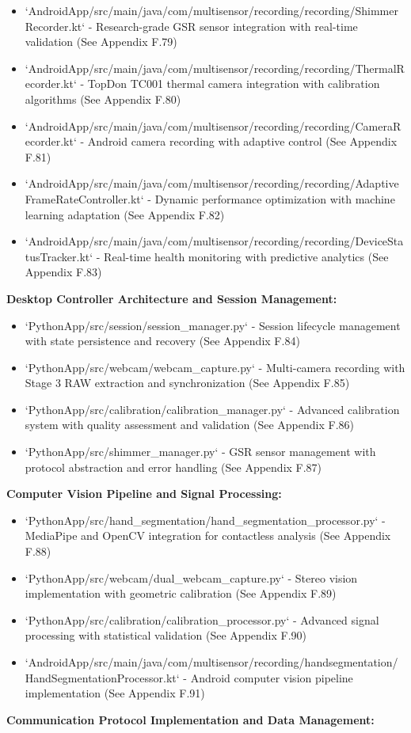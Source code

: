 \documentclass[12pt,a4paper]{article}
\begin{document}
\begin{itemize}
\item `AndroidApp/src/main/java/com/multisensor/recording/recording/ShimmerRecorder.kt` - Research-grade GSR sensor
  integration with real-time validation (See Appendix F.79)
\item `AndroidApp/src/main/java/com/multisensor/recording/recording/ThermalRecorder.kt` - TopDon TC001 thermal camera
  integration with calibration algorithms (See Appendix F.80)
\item `AndroidApp/src/main/java/com/multisensor/recording/recording/CameraRecorder.kt` - Android camera recording with
  adaptive control (See Appendix F.81)
\item `AndroidApp/src/main/java/com/multisensor/recording/recording/AdaptiveFrameRateController.kt` - Dynamic performance
  optimization with machine learning adaptation (See Appendix F.82)
\item `AndroidApp/src/main/java/com/multisensor/recording/recording/DeviceStatusTracker.kt` - Real-time health monitoring
  with predictive analytics (See Appendix F.83)

\end{itemize}
\textbf{Desktop Controller Architecture and Session Management:}

\begin{itemize}
\item `PythonApp/src/session/session_manager.py` - Session lifecycle management with state persistence and recovery (See
  Appendix F.84)
\item `PythonApp/src/webcam/webcam_capture.py` - Multi-camera recording with Stage 3 RAW extraction and synchronization (See
  Appendix F.85)
\item `PythonApp/src/calibration/calibration_manager.py` - Advanced calibration system with quality assessment and
  validation (See Appendix F.86)
\item `PythonApp/src/shimmer_manager.py` - GSR sensor management with protocol abstraction and error handling (See Appendix
  F.87)

\end{itemize}
\textbf{Computer Vision Pipeline and Signal Processing:}

\begin{itemize}
\item `PythonApp/src/hand_segmentation/hand_segmentation_processor.py` - MediaPipe and OpenCV integration for contactless
  analysis (See Appendix F.88)
\item `PythonApp/src/webcam/dual_webcam_capture.py` - Stereo vision implementation with geometric calibration (See Appendix
  F.89)
\item `PythonApp/src/calibration/calibration_processor.py` - Advanced signal processing with statistical validation (See
  Appendix F.90)
\item `AndroidApp/src/main/java/com/multisensor/recording/handsegmentation/HandSegmentationProcessor.kt` - Android computer
  vision pipeline implementation (See Appendix F.91)

\end{itemize}
\textbf{Communication Protocol Implementation and Data Management:}
\end{document}
